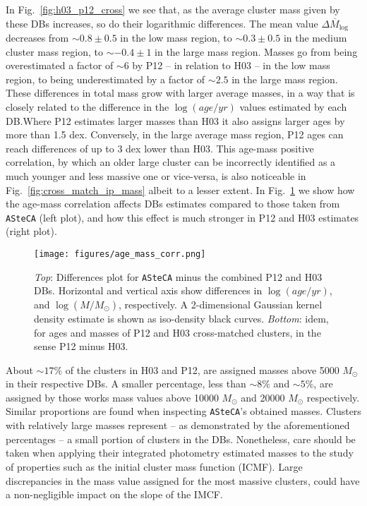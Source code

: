 \documentclass{aa}
\begin{document}
In Fig.~\ref{fig:h03_p12_cross} we see that, as the average cluster mass given
by these DBs increases, so do their logarithmic differences.
The mean value $\overline{\Delta M_{\log}}$ decreases from ${\sim}0.8\pm0.5$ in
the low mass region, to ${\sim}0.3\pm0.5$ in the medium cluster mass region, to
${\sim-}0.4\pm1$ in the large mass region. Masses go from being overestimated
a factor of ${\sim}6$ by P12 -- in relation to H03 -- in the low mass region, to
being underestimated by a factor of ${\sim}2.5$ in the large mass region.
%
These differences in total mass grow with larger average masses, in a way that
is closely related to the difference in the $\log(age/yr)$ values estimated by
each DB.\@ Where P12 estimates larger masses than H03 it also assigns larger
ages by more than 1.5 dex. Conversely, in the large average mass region, P12
ages can reach differences of up to 3 dex lower than H03.
%
This age-mass positive correlation, by which an older large cluster can be
incorrectly identified as a much younger and less massive one or vice-versa, is
also noticeable in Fig.~\ref{fig:cross_match_ip_mass} albeit to a lesser
extent. In Fig.~\ref{fig:age_mass_corr} we show how the age-mass correlation
affects DBs estimates compared to those taken from \texttt{ASteCA} (left plot),
and how this effect is much stronger in P12 and H03 estimates (right plot).

\begin{figure}
\centering
\texttt{[image: figures/age\_mass\_corr.png]}
\caption{\emph{Top}: Differences plot for \texttt{ASteCA} minus the combined P12
and H03 DBs. Horizontal and vertical axis show differences in
$\log(age/yr)$, and $\log(M/M_{\odot})$, respectively.
A 2-dimensional Gaussian kernel density estimate is shown as iso-density black
curves.
\emph{Bottom}: idem, for ages and masses of P12 and H03 cross-matched clusters,
in the sense P12 minus H03.}
\label{fig:age_mass_corr}
\end{figure}

About ${\sim}17\%$ of the clusters in H03 and P12, are assigned masses
above 5000 $M_{\odot}$ in their respective DBs. A smaller percentage,
less than ${\sim}8\%$ and ${\sim}5\%$, are assigned by those works mass values
above 10000 $M_{\odot}$ and 20000 $M_{\odot}$ respectively. Similar proportions
are found when inspecting \texttt{ASteCA}'s obtained masses.
%
Clusters with relatively large masses represent -- as demonstrated by
the aforementioned percentages -- a small portion of clusters in the DBs.
Nonetheless, care should be taken when applying their integrated photometry
estimated masses to the study of properties such as the initial cluster
mass function (ICMF).
Large discrepancies in the mass value assigned for the most massive clusters, could
have a non-negligible impact on the slope of the IMCF.\@
\end{document}

